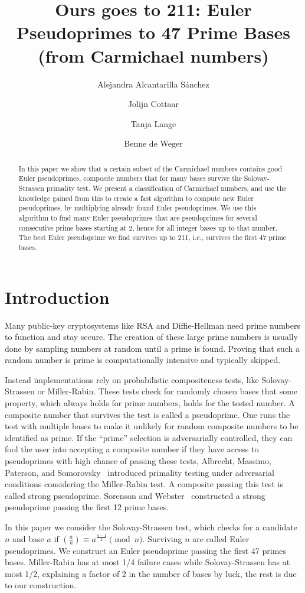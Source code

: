 \documentclass[runningheads]{amsart}
\title[Ours goes to 211: Euler Pseudoprimes to 47 Prime Bases]{Ours goes to 211: Euler Pseudoprimes to 47 Prime Bases (from Carmichael numbers)}
\author[A.~Alcantarilla Sánchez]{Alejandra Alcantarilla Sánchez}
\author[J.~Cottaar]{Jolijn Cottaar}
\author[T.~Lange]{Tanja Lange}
\author[B.~de Weger]{Benne de Weger}
\begin{document}
\begin{abstract}
In this paper we show that a certain subset of the Carmichael numbers contains good
Euler pseudoprimes,
composite numbers that for many bases survive the Solovay-Strassen primality test.
We present a classification of Carmichael numbers,
and use the knowledge gained from this to create a fast algorithm to compute new Euler
pseudoprimes,
by multiplying already found Euler pseudoprimes.
We use this algorithm to find many Euler pseudoprimes that are pseudoprimes for several
consecutive prime bases starting at 2,
hence for all integer bases up to that number.
The best Euler pseudoprime we find survives up to 211,
i.e.,
survives the first 47 prime bases.
\end{abstract}

\maketitle

\section{Introduction}

Many public-key cryptosystems like RSA and Diffie-Hellman need prime numbers to function
and stay secure.
The creation of these large prime numbers is usually done by sampling numbers at random
until a prime is found.
Proving that such a random number is prime is computationally intensive and typically
skipped.

Instead implementations rely on probabilistic compositeness tests,
like Solovay-Strassen or Miller-Rabin.
These tests check for randomly chosen bases that some property,
which always holds for prime numbers,
holds for the tested number.
A composite number that survives the test is called a pseudoprime.
One runs the test with multiple bases to make it unlikely for random composite numbers
to be identified as prime.
If the ``prime'' selection is adversarially controlled,
they can fool the user into accepting a composite number if they have access to pseudoprimes
with high chance of passing these tests,
Albrecht,
Massimo,
Paterson,
and
Somorovsky~\cite{CCS:AMPS18}
introduced primality testing under adversarial conditions considering the Miller-Rabin
test.
A composite passing this test is called strong pseudoprime.
Sorenson and
Webster~\cite{2017/sorenson}
constructed a strong pseudoprime passing the first 12 prime bases.

In this paper we consider the Solovay-Strassen test,
which checks for a candidate $n$ and base $a$ if
$\left(\frac{a}{n}\right)
\equiv
a^\frac{n-1}{2}
\pmod
n$.
Surviving $n$ are called Euler pseudoprimes.
We construct an Euler pseudoprime passing the first 47 primes bases.
Miller-Rabin has at most
1/4
failure cases while Solovay-Strassen has at most
1/2,
explaining a factor of 2 in the number of bases by luck,
the rest is due to our construction.
\end{document}
